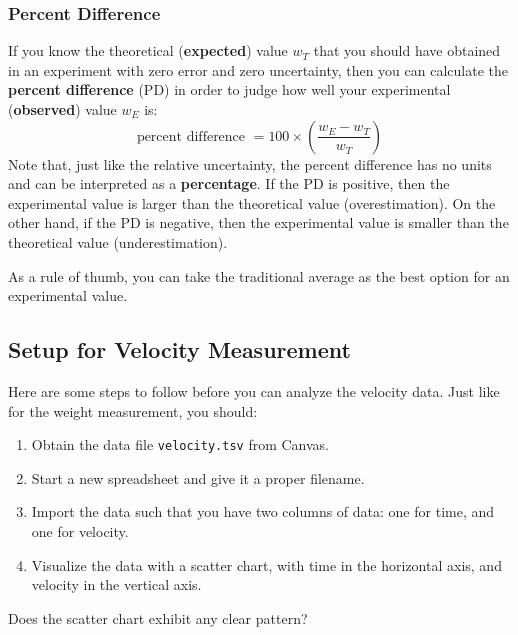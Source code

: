 \subsubsection{Percent Difference}
%
If you know the theoretical (\textbf{expected}) value $w_{T}$ that you should have obtained in an experiment with zero error and zero uncertainty, then you can calculate the \textbf{percent difference} (PD) in order to judge how well your experimental (\textbf{observed}) value $w_{E}$ is:
\begin{equation}
    \text{percent difference } = 100 \times \left( \frac{w_{E} - w_{T}}{w_{T}} \right)
    \label{eq:00.percent.diff}
\end{equation}
Note that, just like the relative uncertainty, the percent difference has no units and can be interpreted as a \textbf{percentage}. If the PD is positive, then the experimental value is larger than the theoretical value (overestimation). On the other hand, if the PD is negative, then the experimental value is smaller than the theoretical value (underestimation).

As a rule of thumb, you can take the traditional average as the best option for an experimental value.
%
\subsection{Setup for Velocity Measurement}
%
Here are some steps to follow before you can analyze the velocity data. Just like for the weight measurement, you should:
\begin{enumerate}
    \item Obtain the data file \texttt{velocity.tsv} from Canvas.
    \item Start a new spreadsheet and give it a proper filename.
    \item Import the data such that you have two columns of data: one for time, and one for velocity.
    \item Visualize the data with a scatter chart, with time in the horizontal axis, and velocity in the vertical axis.
\end{enumerate}
Does the scatter chart exhibit any clear pattern?
%
\begin{center}
\end{center}
%
